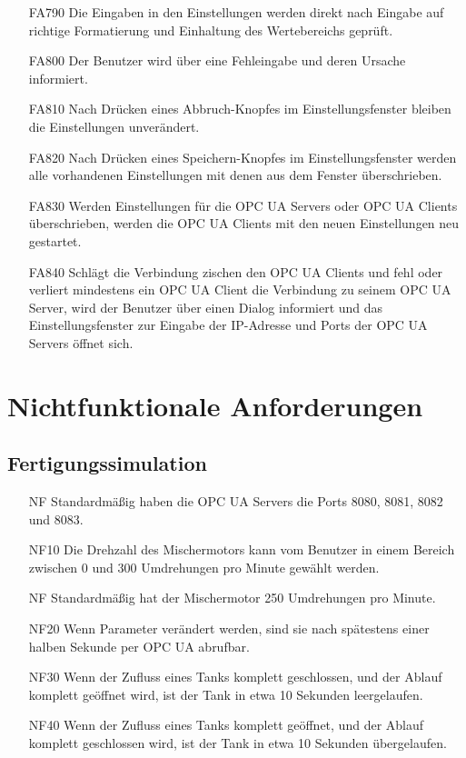\documentclass[parskip=full]{scrartcl}
\begin{document}
\begin{enumerate}
  \item[FA790] Die Eingaben in den Einstellungen werden direkt nach Eingabe auf richtige Formatierung und Einhaltung des Wertebereichs gepr\"uft.
  \item[FA800] Der Benutzer wird über eine Fehleingabe und deren Ursache informiert.
  \item[FA810] Nach Drücken eines Abbruch-Knopfes im Einstellungsfenster bleiben die Einstellungen unverändert.
  \item[FA820] Nach Drücken eines Speichern-Knopfes im Einstellungsfenster werden alle vorhandenen Einstellungen mit denen aus dem Fenster überschrieben.
  \item[FA830] Werden Einstellungen für die \glspl{OPC UA Server} oder \glspl{OPC UA Client} überschrieben, werden die \glspl{OPC UA Client} mit den neuen Einstellungen neu gestartet.
  \item[FA840] Schlägt die Verbindung zischen den \glspl{OPC UA Client} und  fehl oder verliert mindestens ein \gls{OPC UA Client} die Verbindung zu seinem \gls{OPC UA Server}, wird 
    der Benutzer über einen Dialog informiert und das Einstellungsfenster zur Eingabe der \gls{IP-Adresse} und Ports der \glspl{OPC UA Server} öffnet sich.
\end{enumerate}

\pagebreak
\section{Nichtfunktionale Anforderungen}
\subsection{Fertigungssimulation}
\begin{enumerate}
  \item[NF] Standardmäßig haben die \glspl{OPC UA Server} die Ports 8080, 8081, 8082 und 8083.
  \item[NF10] Die Drehzahl des Mischermotors kann vom Benutzer in einem Bereich zwischen 0 und 300 Umdrehungen pro Minute gewählt werden.
  \item[NF] Standardmäßig hat der Mischermotor 250 Umdrehungen pro Minute.
  \item[NF20] Wenn Parameter verändert werden, sind sie nach spätestens einer halben Sekunde per \gls{OPC UA} abrufbar.
  \item[NF30] Wenn der Zufluss eines Tanks komplett geschlossen, und der Ablauf komplett geöffnet wird, ist der Tank in etwa 10 Sekunden leergelaufen.
  \item[NF40] Wenn der Zufluss eines Tanks komplett geöffnet, und der Ablauf komplett geschlossen wird, ist der Tank in etwa 10 Sekunden übergelaufen.
\end{enumerate}
\end{document}
